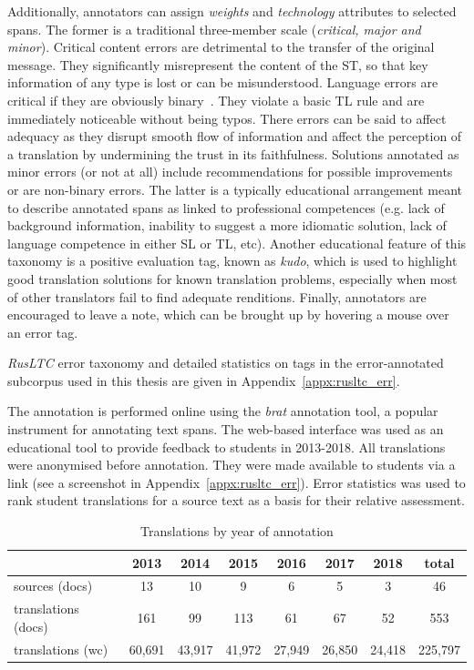 Additionally, annotators can assign \textit{weights} and \textit{technology} attributes to selected spans. The former is a traditional three-member scale (\textit{critical, major and minor}). Critical content errors are detrimental to the transfer of the original message. They significantly misrepresent the content of the ST, so that key information of any type is lost or can be misunderstood. Language errors are critical if they are obviously binary~\cite{Pym1992}. They violate a basic TL rule and are immediately noticeable without being typos. There errors can be said to affect adequacy as they disrupt smooth flow of information and affect the perception of a translation by undermining the trust in its faithfulness. Solutions annotated as minor errors (or not at all) include recommendations for possible improvements or are non-binary errors.
The latter is a typically educational arrangement meant to describe annotated spans as linked to professional competences (e.g. lack of background information, inability to suggest a more idiomatic solution, lack of language competence in either SL or TL, etc). Another educational feature of this taxonomy is a positive evaluation tag, known as \textit{kudo}, which is used to highlight good translation solutions for known translation problems, especially when most of other translators fail to find adequate renditions. 
Finally, annotators are encouraged to leave a note, which can be brought up by hovering a mouse over an error tag. 

\textit{RusLTC} error taxonomy and detailed statistics on tags in the error-annotated subcorpus used in this thesis are given in Appendix~\ref{appx:rusltc_err}.

The annotation is performed online using the \textit{brat} annotation tool, a popular instrument for annotating text spans. The web-based interface was used as an educational tool to provide feedback to students in 2013-2018. All translations were anonymised before annotation. They were made available to students via a link (see a screenshot in Appendix~\ref{appx:rusltc_err}).   
Error statistics was used to rank student translations for a source text as a basis for their relative assessment.

\begin{table}[H]
	\centering
	\begin{tabular}{l|c|c|c|c|c|c|c}
		\toprule
		
		&   2013  &   2014  & 2015  &  2016  & 2017  & 2018 & total \\
		\midrule				
		sources (docs)      & 13 & 10 & 9 &  6 & 5 & 3 & 46 \\
		translations (docs) & 161  & 99 & 113 & 61  & 67 &  52 & 553 \\
		translations (wc)   & 60,691 & 43,917 & 41,972 & 27,949  & 26,850 & 24,418 & 225,797 \\
		\bottomrule
	\end{tabular}
	\caption{\label{tab:by_year}Translations by year of annotation}
\end{table} 

